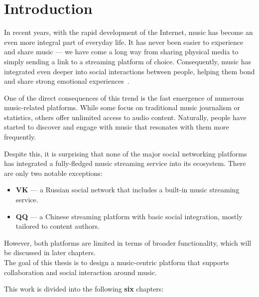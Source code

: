 \chapter{Introduction}

In recent years, with the rapid development of the Internet,
music has become an even more integral part of everyday life.
It has never been easier to experience and share music — we have come
a long way from sharing physical media to simply sending a link to a streaming platform of choice.
Consequently, music has integrated even deeper into social interactions between people,
helping them bond and share strong emotional experiences~\cite{1}.

One of the direct consequences of this trend is the fast emergence of numerous music-related platforms.
While some focus on traditional music journalism or statistics, others offer unlimited access to audio content.
Naturally, people have started to discover and engage with music that resonates with them more frequently.

Despite this, it is surprising that none of the major social networking platforms has integrated
a fully-fledged music streaming service into its ecosystem.
There are only two notable exceptions:

\begin{itemize}
    \item \textbf{VK} — a Russian social network that includes a built-in music streaming service.
    \item \textbf{QQ} — a Chinese streaming platform with basic social integration, mostly tailored to content authors.
\end{itemize}

However, both platforms are limited in terms of broader functionality, which will be discussed in later chapters.\\

The goal of this thesis is to design a music-centric platform that supports
collaboration and social interaction around music.

This work is divided into the following \textbf{six} chapters:

